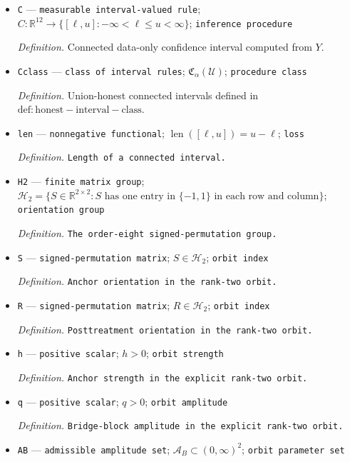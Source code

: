 \documentclass{article}
\begin{document}
\begin{itemize}
  \item \texttt{C} --- \texttt{measurable interval-\allowbreak{}valued rule}; \(C:\mathbb R^{12}\to\{[\ell,u]: -\infty<\ell\le u<\infty\}\); \texttt{inference procedure}
  \par\smallskip\noindent\emph{Definition.} Connected data-only confidence interval computed from \(Y\).
  \item \texttt{Cclass} --- \texttt{class of interval rules}; \(\mathfrak C_{\alpha}(\mathcal U)\); \texttt{procedure class}
  \par\smallskip\noindent\emph{Definition.} Union-honest connected intervals defined in \(\mathrm{def:honest-interval-class}\).
  \item \texttt{len} --- \texttt{nonnegative functional}; \(\operatorname{len}([\ell,u])=u-\ell\); \texttt{loss}
  \par\smallskip\noindent\emph{Definition.} \texttt{Length of a connected interval.}
  \item \texttt{H2} --- \texttt{finite matrix group}; \(\mathcal H_2=\{S\in\mathbb R^{2\times2}:S\text{ has one entry in }\{-1,1\}\text{ in each row and column}\}\); \texttt{orientation group}
  \par\smallskip\noindent\emph{Definition.} \texttt{The order-\allowbreak{}eight signed-\allowbreak{}permutation group.}
  \item \texttt{S} --- \texttt{signed-\allowbreak{}permutation matrix}; \(S\in\mathcal H_2\); \texttt{orbit index}
  \par\smallskip\noindent\emph{Definition.} \texttt{Anchor orientation in the rank-\allowbreak{}two orbit.}
  \item \texttt{R} --- \texttt{signed-\allowbreak{}permutation matrix}; \(R\in\mathcal H_2\); \texttt{orbit index}
  \par\smallskip\noindent\emph{Definition.} \texttt{Posttreatment orientation in the rank-\allowbreak{}two orbit.}
  \item \texttt{h} --- \texttt{positive scalar}; \(h>0\); \texttt{orbit strength}
  \par\smallskip\noindent\emph{Definition.} \texttt{Anchor strength in the explicit rank-\allowbreak{}two orbit.}
  \item \texttt{q} --- \texttt{positive scalar}; \(q>0\); \texttt{orbit amplitude}
  \par\smallskip\noindent\emph{Definition.} \texttt{Bridge-\allowbreak{}block amplitude in the explicit rank-\allowbreak{}two orbit.}
  \item \texttt{AB} --- \texttt{admissible amplitude set}; \(\mathcal A_B\subset(0,\infty)^2\); \texttt{orbit parameter set}

\end{itemize}
\end{document}

